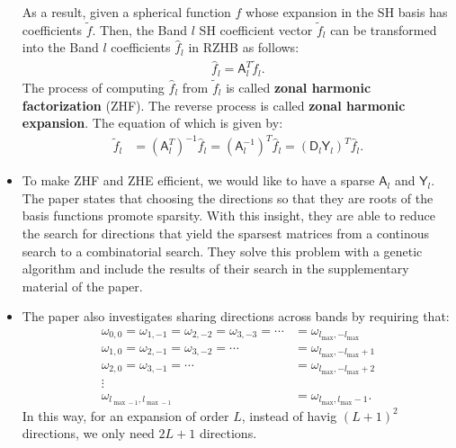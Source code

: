 \documentclass[10pt]{article}
\begin{document}
\begin{itemize}
        As a result, given a spherical function $f$ whose expansion in the SH basis has coefficients $\tilde{f}$.  Then, the Band $l$ SH coefficient vector $\tilde{f}_l$ can be transformed into the Band $l$ coefficients $\hat{f}_l$ in RZHB as follows:
        \begin{align*}
            \hat{f}_l = \mathsf{A}_l^T \tilde{f}_l.
        \end{align*}
        The process of computing $\hat{f}_l$ from $\tilde{f}_l$ is called \textbf{zonal harmonic factorization} (ZHF).  The reverse process is called \textbf{zonal harmonic expansion}.  The equation of which is given by:
        \begin{align*}
            \tilde{f}_l 
            &= (\mathsf{A}_l^T)^{-1} \hat{f}_l
            = (\mathsf{A}_l^{-1})^{T} \hat{f}_l
            = (\mathsf{D}_l \mathsf{Y}_l)^{T} \hat{f}_l.
        \end{align*}

        \item To make ZHF and ZHE efficient, we would like to have a sparse $\mathsf{A}_l$ and $\mathsf{Y}_l$.  The paper states that choosing the directions so that they are roots of the basis functions promote sparsity.  With this insight, they are able to reduce the search for directions that yield the sparsest matrices from a continous search to a combinatorial search.  They solve this problem with a genetic algorithm and include the results of their search in the supplementary material of the paper.

        \item The paper also investigates sharing directions across bands by requiring that:
        \begin{align*}
            \omega_{0,0} = \omega_{1,-1} = \omega_{2,-2} = \omega_{3,-3} = \dotsb &= \omega_{l_{\max},-l_{\max}} \\
            \omega_{1,0} = \omega_{2,-1} = \omega_{3,-2} = \dotsb &= \omega_{l_{\max},-l_{\max}+1} \\
            \omega_{2,0} = \omega_{3,-1} = \dotsb &= \omega_{l_{\max},-l_{\max}+2} \\
            \vdots & \\
            \omega_{l_{\max-1},l_{\max-1}} &= \omega_{l_{\max},l_{\max}-1}.
        \end{align*}
        In this way, for an expansion of order $L$, instead of havig $(L+1)^2$ directions, we only need $2L+1$ directions.


\end{itemize}
\end{document}
